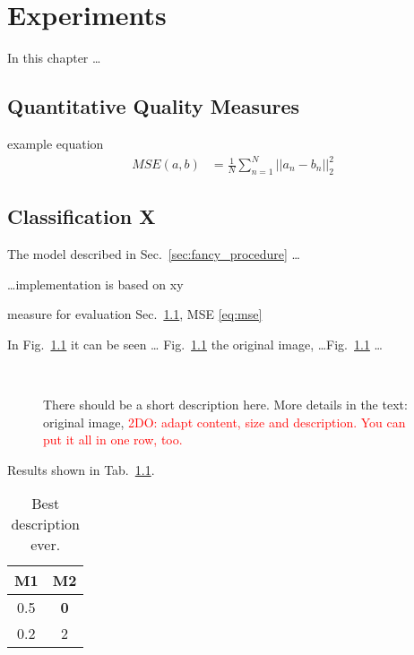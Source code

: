 \chapter{Experiments}

In this chapter \ldots 

\section{Quantitative Quality Measures}
\label{sec:measures}

example equation
\begin{align}
    MSE(a,b) &= \frac{1}{N}\sum_{n=1}^N||a_n-b_n||_2^2
    \label{eq:mse}
\end{align}


\section{Classification X}

The model described in Sec.~\ref{sec:fancy_procedure} \ldots 

\ldots implementation is based on xy

measure for evaluation Sec.~\ref{sec:measures}, MSE \eqref{eq:mse}


In Fig.~\ref{fig:subfigs} it can be seen \ldots 
Fig.~\ref{fig:subfigs} the original image, \ldots Fig.~\ref{fig:subfigs} \ldots 

\begin{figure}[htb] %
	\centering
	\\ %
	\caption{%
		There should be a short description here. More details in the text: \protect{} original image, \protect{} 
		\textcolor{red}{2DO: adapt content, size and description. You can put it all in one row, too.}
	}
	\label{fig:subfigs}
\end{figure}



Results shown in Tab.~\ref{tab:mse_results}. 

\begin{table}[htb]
	\centering
	\caption{Best description ever.} %
	\label{tab:mse_results}
	\begin{tabular}{cc}
		\toprule 
		M1 & M2 \\ \midrule
		0.5  & \textbf{0}\\
		0.2 &  2\\
		\bottomrule
	\end{tabular}
\end{table}